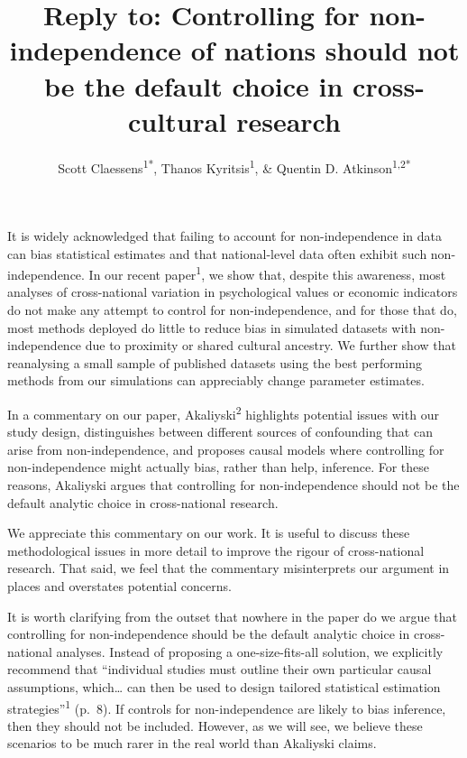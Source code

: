 \documentclass[
  man, donotrepeattitle,floatsintext]{apa6}
\title{Reply to: Controlling for non-independence of nations should not be the default choice in cross-cultural research}
\author{Scott Claessens\textsuperscript{1*}, Thanos Kyritsis\textsuperscript{1}, \& Quentin D. Atkinson\textsuperscript{1,2*}}
\date{}
\affiliation{\vspace{0.5cm}\textsuperscript{1} \footnotesize School of Psychology, University of Auckland, Auckland, New Zealand\\\textsuperscript{2} \footnotesize School of Anthropology and Museum Ethnography, University of Oxford, Oxford, United Kingdom \newline *email: \href{mailto:scott.claessens@gmail.com}{\nolinkurl{scott.claessens@gmail.com}}; \href{mailto:q.atkinson@auckland.ac.nz}{\nolinkurl{q.atkinson@auckland.ac.nz}}}
\begin{document}
\maketitle

\linenumbers

It is widely acknowledged that failing to account for non-independence in data
can bias statistical estimates and that national-level data often exhibit such
non-independence. In our recent paper\textsuperscript{1}, we show that, despite
this awareness, most analyses of cross-national variation in psychological
values or economic indicators do not make any attempt to control for
non-independence, and for those that do, most methods deployed do little to
reduce bias in simulated datasets with non-independence due to proximity or
shared cultural ancestry. We further show that reanalysing a small sample of
published datasets using the best performing methods from our simulations can
appreciably change parameter estimates.

In a commentary on our paper, Akaliyski\textsuperscript{2} highlights potential
issues with our study design, distinguishes between different sources of
confounding that can arise from non-independence, and proposes causal models
where controlling for non-independence might actually bias, rather than help,
inference. For these reasons, Akaliyski argues that controlling for
non-independence should not be the default analytic choice in cross-national
research.

We appreciate this commentary on our work. It is useful to discuss these
methodological issues in more detail to improve the rigour of cross-national
research. That said, we feel that the commentary misinterprets our
argument in places and overstates potential concerns.

It is worth clarifying from the outset that nowhere in the paper do we argue
that controlling for non-independence should be the default analytic choice
in cross-national analyses. Instead of proposing a one-size-fits-all
solution, we explicitly recommend that ``individual studies must outline
their own particular causal assumptions, which\ldots{} can then be used to design
tailored statistical estimation strategies''\textsuperscript{1} (p.~8). If controls
for non-independence are likely to bias inference, then they should not be
included. However, as we will see, we believe these scenarios to be much
rarer in the real world than Akaliyski claims.
\end{document}
